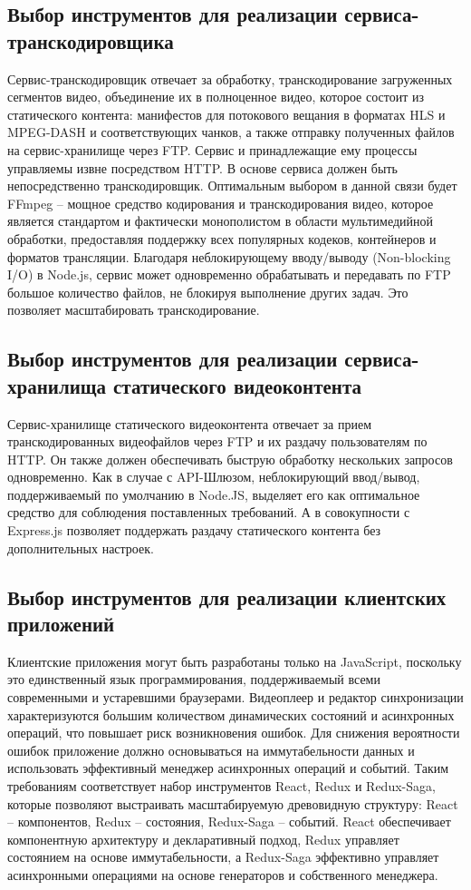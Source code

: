 	\subsection{Выбор инструментов для реализации сервиса-транскодировщика}
	
	Сервис-транскодировщик отвечает за обработку, транскодирование загруженных сегментов видео, объединение их в полноценное видео, которое состоит из статического контента: манифестов для потокового вещания в форматах HLS и MPEG-DASH и соответствующих чанков, а также отправку полученных файлов на сервис-хранилище через FTP. Сервис и принадлежащие ему процессы управляемы извне посредством HTTP. В основе сервиса должен быть непосредственно транскодировщик. Оптимальным выбором в данной связи будет FFmpeg – мощное средство кодирования и транскодирования видео, которое является стандартом и фактически монополистом в области мультимедийной обработки, предоставляя поддержку всех популярных кодеков, контейнеров и форматов трансляции. Благодаря неблокирующему вводу/выводу (Non-blocking I/O) в Node.js, сервис может одновременно обрабатывать и передавать по FTP большое количество файлов, не блокируя выполнение других задач. Это позволяет масштабировать транскодирование.

	\subsection{Выбор инструментов для реализации сервиса-хранилища статического видеоконтента}

	Сервис-хранилище статического видеоконтента отвечает за прием транскодированных видеофайлов через FTP и их раздачу пользователям по HTTP. Он также должен обеспечивать быструю обработку нескольких запросов одновременно. Как в случае с API-Шлюзом, неблокирующий ввод/вывод, поддерживаемый по умолчанию в Node.JS, выделяет его как оптимальное средство для соблюдения поставленных требований. А в совокупности с Express.js позволяет поддержать раздачу статического контента без дополнительных настроек.

	\subsection{Выбор инструментов для реализации клиентских приложений}

	Клиентские приложения могут быть разработаны только на JavaScript, поскольку это единственный язык программирования, поддерживаемый всеми современными и устаревшими браузерами. Видеоплеер и редактор синхронизации характеризуются большим количеством динамических состояний и асинхронных операций, что повышает риск возникновения ошибок. Для снижения вероятности ошибок приложение должно основываться на иммутабельности данных и использовать эффективный менеджер асинхронных операций и событий. Таким требованиям соответствует набор инструментов React, Redux и Redux-Saga, которые позволяют выстраивать масштабируемую древовидную структуру: React – компонентов, Redux – состояния, Redux-Saga – событий. React обеспечивает компонентную архитектуру и декларативный подход, Redux управляет состоянием на основе иммутабельности, а Redux-Saga эффективно управляет асинхронными операциями на основе генераторов и собственного менеджера.

